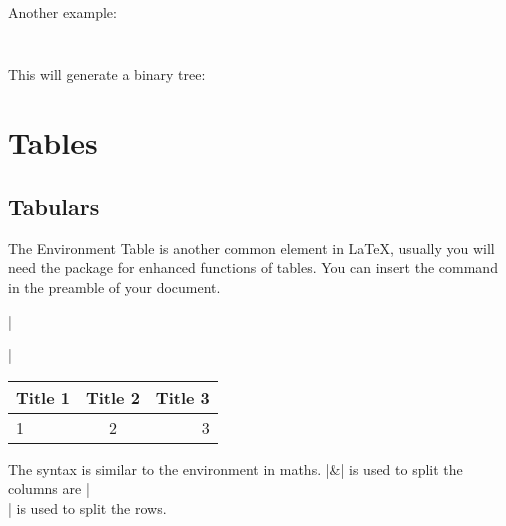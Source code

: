 \begin{frame}[fragile]

Another example:

\begin{example}
\inputminted[firstline=1,lastline=20]{latex}{../examples/binary_tree.tex}
\end{example}

\end{frame}

\begin{frame}

\begin{exampleblock}{}
\inputminted[firstline=21]{latex}{../examples/binary_tree.tex}
\end{exampleblock}

This will generate a binary tree:
\begin{center}

\end{center}

\end{frame}


\section{Tables}

\subsection{Tabulars}

\begin{frame}[fragile]{The  Environment}
	Table is another common element in \LaTeX, usually you will need the  package for enhanced functions of tables. You can insert the command in the preamble of your document.

\begin{command}
\LC|\usepackage{array}|
\end{command}

\begin{latexexamplesplit}
\begin{tabular}{|l|c|r|}
  \hline
  Title 1 & Title 2 & Title 3 \\
  \hline
  1 & 2 & 3 \\
  \hline
\end{tabular}
\end{latexexamplesplit}

The syntax is similar to the  environment in maths. \LC|&| is used to split the columns are \LC|\\| is used to split the rows. \medskip



\end{frame}

